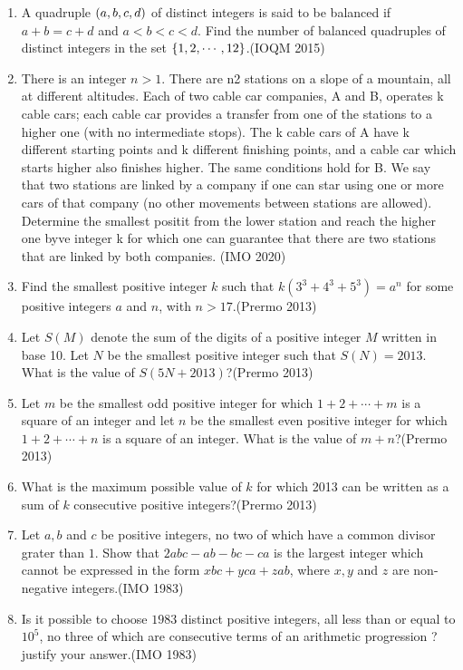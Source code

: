 \begin{enumerate}
    \item A quadruple $\left(a, b, c, d\right)$ of distinct integers is said to be balanced if $a +b = c + d$ and $a < b < c < d$. Find the number of balanced quadruples of distinct integers in the set $\left\{1, 2, \cdots, 12\right\}$.\hfill(IOQM 2015)
     \item There is an integer $n>1$. There are n2 stations on a slope of a mountain, all at
different altitudes. Each of two cable car companies, A and B, operates k cable cars; each cable
car provides a transfer from one of the stations to a higher one (with no intermediate stops). The
k cable cars of A have k different starting points and k different finishing points, and a cable car
which starts higher also finishes higher. The same conditions hold for B. We say that two stations
are linked by a company if one can star using
one or more cars of that company (no other movements between stations are allowed).
Determine the smallest positit from the lower station and reach the higher one byve integer k for which one can guarantee that there are two stations
that are linked by both companies.
\hfill(IMO 2020)
\item Find the smallest positive integer $ k $ such that 
$ k(3^3 + 4^3 + 5^3) = a^n $ for some positive integers $ a $ and $ n $, with $ n > 17 $.\hfill(Prermo 2013)

\item Let $ S(M) $ denote the sum of the digits of a positive integer $ M $ written in base 10. Let $ N $ be the smallest positive integer such that $ S(N) = 2013 $. What is the value of $ S(5N + 2013) $?\hfill(Prermo 2013)

\item Let $ m $ be the smallest odd positive integer for which
$ 1 + 2 + \cdots + m $
is a square of an integer and let $ n $ be the smallest even positive integer for which
$ 1 + 2 + \cdots + n $
is a square of an integer. What is the value of $ m + n $?\hfill(Prermo 2013)

\item What is the maximum possible value of $ k $ for which 2013 can be written as a sum of $ k $ consecutive positive integers?\hfill(Prermo 2013)
\item Let $a,b$ and $c$ be positive integers, no two of which have a common divisor grater than $1$. Show that $2abc-ab-bc-ca$ is the largest integer which cannot be expressed in the form $xbc+yca+zab$, where $x,y$ and $z$ are non-negative integers.\hfill(IMO 1983)

\item Is it possible to choose $1983$ distinct positive integers, all less than or equal to $10^5$, no three of which are consecutive terms of
an arithmetic progression ? justify your answer.\hfill(IMO 1983)


\end{enumerate}
